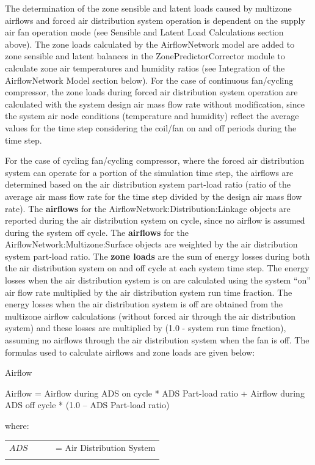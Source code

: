The determination of the zone sensible and latent loads caused by multizone airflows and forced air distribution system operation is dependent on the supply air fan operation mode (see Sensible and Latent Load Calculations section above). The zone loads calculated by the AirflowNetwork model are added to zone sensible and latent balances in the ZonePredictorCorrector module to calculate zone air temperatures and humidity ratios (see Integration of the AirflowNetwork Model section below). For the case of continuous fan/cycling compressor, the zone loads during forced air distribution system operation are calculated with the system design air mass flow rate without modification, since the system air node conditions (temperature and humidity) reflect the average values for the time step considering the coil/fan on and off periods during the time step.

For the case of cycling fan/cycling compressor, where the forced air distribution system can operate for a portion of the simulation time step, the airflows are determined based on the air distribution system part-load ratio (ratio of the average air mass flow rate for the time step divided by the design air mass flow rate). The \textbf{airflows} for the AirflowNetwork:Distribution:Linkage objects are reported during the air distribution system on cycle, since no airflow is assumed during the system off cycle. The \textbf{airflows} for the AirflowNetwork:Multizone:Surface objects are weighted by the air distribution system part-load ratio. The \textbf{zone loads} are the sum of energy losses during both the air distribution system on and off cycle at each system time step. The energy losses when the air distribution system is on are calculated using the system ``on'' air flow rate multiplied by the air distribution system run time fraction. The energy losses when the air distribution system is off are obtained from the multizone airflow calculations (without forced air through the air distribution system) and these losses are multiplied by (1.0 - system run time fraction), assuming no airflows through the air distribution system when the fan is off. The formulas used to calculate airflows and zone loads are given below:

Airflow

Airflow = Airflow during ADS on cycle * ADS Part-load ratio + Airflow during ADS off cycle * (1.0 -- ADS Part-load ratio)

where:

\begin{tabular}{lp{0.7\linewidth}}
\\
$ADS$ &= Air Distribution System\\
\\
\end{tabular}


